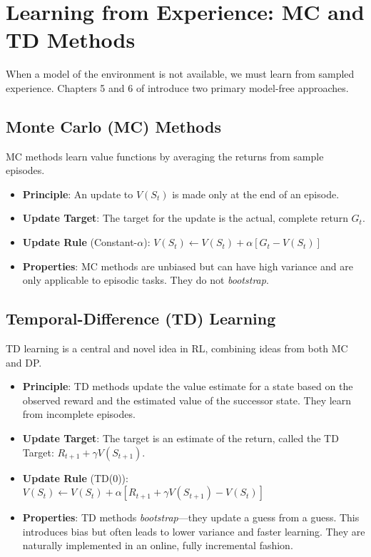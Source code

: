 \section{Learning from Experience: MC and TD Methods}
When a model of the environment is not available, we must learn from sampled experience. Chapters 5 and 6 of \cite{Sutton2018} introduce two primary model-free approaches.

\subsection{Monte Carlo (MC) Methods}
MC methods learn value functions by averaging the returns from sample episodes.
\begin{itemize}
    \item \textbf{Principle}: An update to $V(S_t)$ is made only at the end of an episode.
    \item \textbf{Update Target}: The target for the update is the actual, complete return $G_t$.
    \item \textbf{Update Rule} (Constant-$\alpha$): $V(S_t) \leftarrow V(S_t) + \alpha [G_t - V(S_t)]$
    \item \textbf{Properties}: MC methods are unbiased but can have high variance and are only applicable to episodic tasks. They do not \textit{bootstrap}.
\end{itemize}

\subsection{Temporal-Difference (TD) Learning}
TD learning is a central and novel idea in RL, combining ideas from both MC and DP.
\begin{itemize}
    \item \textbf{Principle}: TD methods update the value estimate for a state based on the observed reward and the estimated value of the successor state. They learn from incomplete episodes.
    \item \textbf{Update Target}: The target is an estimate of the return, called the TD Target: $R_{t+1} + \gamma V(S_{t+1})$.
    \item \textbf{Update Rule} (TD(0)): $V(S_t) \leftarrow V(S_t) + \alpha [R_{t+1} + \gamma V(S_{t+1}) - V(S_t)]$
    \item \textbf{Properties}: TD methods \textit{bootstrap}—they update a guess from a guess. This introduces bias but often leads to lower variance and faster learning. They are naturally implemented in an online, fully incremental fashion.
\end{itemize}

